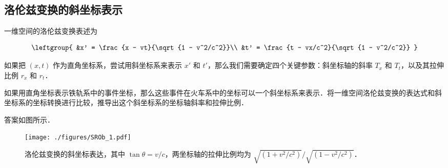 
\subsection{洛伦兹变换的斜坐标表示}

一维空间的洛伦兹变换表述为

\begin{equation}\label{SROb_eq1}
\leftgroup{
&x' = \frac{x - vt}{\sqrt{1 - v^2/c^2}}\\
&t' = \frac{t - vx/c^2}{\sqrt{1 - v^2/c^2}}
}
\end{equation}

如果把 $(x,t)$ 作为直角坐标系，尝试用斜坐标系来表示 $x'$ 和 $t'$，那么我们需要确定四个关键参数：斜坐标轴的斜率 $T_x$ 和 $T_t$，以及其拉伸比例 $r_x$ 和 $r_t$．

\begin{exercise}{}

如果用直角坐标表示铁轨系中的事件坐标，那么这些事件在火车系中的坐标可以一个斜坐标系来表示．将一维空间洛伦兹变换的表达式和斜坐标系的坐标转换进行比较，推导出这个斜坐标系的坐标轴斜率和拉伸比例．

\end{exercise}

答案如图所示．

\begin{figure}[ht]
\centering
\texttt{[image: ./figures/SROb\_1.pdf]}
\caption{洛伦兹变换的斜坐标表达，其中 $\tan{\theta}=v/c$，两坐标轴的拉伸比例均为 $\sqrt{(1+v^2/c^2)}/\sqrt{(1-v^2/c^2)}$．} \label{SROb_fig1}
\end{figure}




